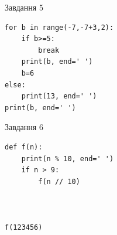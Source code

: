 \documentclass[12pt, ukrainian]{article}
\begin{document}
{\vspace{15mm}
\begin{minipage}[t]{9.7cm}                
{\begin{center}Завдання {5}\end{center}}
\begin{verbatim}
for b in range(-7,-7+3,2):
    if b>=5:
        break
    print(b, end=' ')
    b=6
else:
    print(13, end=' ')
print(b, end=' ')
\end{verbatim}     
\end{minipage}
\vline \hspace{8mm}
\begin{minipage}[t]{8.0cm}                
{\begin{center}Завдання {6}\end{center}}
\begin{verbatim}
def f(n):
    print(n % 10, end=' ')
    if n > 9:
        f(n // 10)
    


f(123456)
\end{verbatim}     
\end{minipage}

}
\newpage
\end{document}
